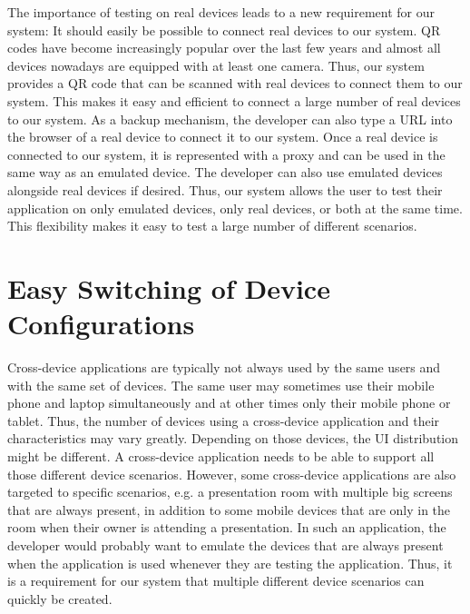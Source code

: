The importance of testing on real devices leads to a new requirement for our system: It should easily be possible to connect real devices to our system. QR codes have become increasingly popular over the last few years and almost all devices nowadays are equipped with at least one camera. Thus, our system provides a QR code that can be scanned with real devices to connect them to our system. This makes it easy and efficient to connect a large number of real devices to our system. As a backup mechanism, the developer can also type a URL into the browser of a real device to connect it to our system. Once a real device is connected to our system, it is represented with a proxy and can be used in the same way as an emulated device. The developer can also use emulated devices alongside real devices if desired. Thus, our system allows the user to test their application on only emulated devices, only real devices, or both at the same time. This flexibility makes it easy to test a large number of different scenarios.

\section{Easy Switching of Device Configurations}

Cross-device applications are typically not always used by the same users and with the same set of devices. The same user may sometimes use their mobile phone and laptop simultaneously and at other times only their mobile phone or tablet. Thus, the number of devices using a cross-device application and their characteristics may vary greatly. Depending on those devices, the UI distribution might be different. A cross-device application needs to be able to support all those different device scenarios. However, some cross-device applications are also targeted to specific scenarios, e.g. a presentation room with multiple big screens that are always present, in addition to some mobile devices that are only in the room when their owner is attending a presentation. In such an application, the developer would probably want to emulate the devices that are always present when the application is used whenever they are testing the application. Thus, it is a requirement for our system that multiple different device scenarios can quickly be created. 

